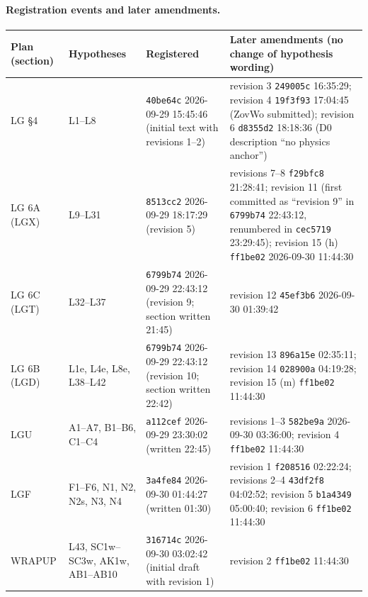 \paragraph*{Registration events and later amendments.}

{\fontsize{7.5}{9}\selectfont\setlength{\tabcolsep}{4pt}
\begin{longtable}{@{}>{\raggedright\arraybackslash}p{}>{\raggedright\arraybackslash}p{}>{\raggedright\arraybackslash}p{}>{\raggedright\arraybackslash}p{}@{}}
\toprule
\textbf{Plan (section)} & \textbf{Hypotheses} & \textbf{Registered} & \textbf{Later amendments (no change of hypothesis wording)} \\
\midrule\endhead
\bottomrule\endlastfoot
LG §4 & L1–L8 & \texttt{40be64c} 2026-09-29 15:45:46 (initial text with revisions 1–2) & revision 3 \texttt{249005c} 16:35:29; revision 4 \texttt{19f3f93} 17:04:45 (ZovWo submitted); revision 6 \texttt{d8355d2} 18:18:36 (D0 description ``no physics anchor'') \\
LG 6A (LGX) & L9–L31 & \texttt{8513cc2} 2026-09-29 18:17:29 (revision 5) & revisions 7–8 \texttt{f29bfc8} 21:28:41; revision 11 (first committed as ``revision 9'' in \texttt{6799b74} 22:43:12, renumbered in \texttt{cec5719} 23:29:45); revision 15 (h) \texttt{ff1be02} 2026-09-30 11:44:30 \\
LG 6C (LGT) & L32–L37 & \texttt{6799b74} 2026-09-29 22:43:12 (revision 9; section written 21:45) & revision 12 \texttt{45ef3b6} 2026-09-30 01:39:42 \\
LG 6B (LGD) & L1e, L4e, L8e, L38–L42 & \texttt{6799b74} 2026-09-29 22:43:12 (revision 10; section written 22:42) & revision 13 \texttt{896a15e} 02:35:11; revision 14 \texttt{028900a} 04:19:28; revision 15 (m) \texttt{ff1be02} 11:44:30 \\
LGU & A1–A7, B1–B6, C1–C4 & \texttt{a112cef} 2026-09-29 23:30:02 (written 22:45) & revisions 1–3 \texttt{582be9a} 2026-09-30 03:36:00; revision 4 \texttt{ff1be02} 11:44:30 \\
LGF & F1–F6, N1, N2, N2s, N3, N4 & \texttt{3a4fe84} 2026-09-30 01:44:27 (written 01:30) & revision 1 \texttt{f208516} 02:22:24; revisions 2–4 \texttt{43df2f8} 04:02:52; revision 5 \texttt{b1a4349} 05:00:40; revision 6 \texttt{ff1be02} 11:44:30 \\
WRAPUP & L43, SC1w–SC3w, AK1w, AB1–AB10 & \texttt{316714c} 2026-09-30 03:02:42 (initial draft with revision 1) & revision 2 \texttt{ff1be02} 11:44:30 \\
\end{longtable}}

